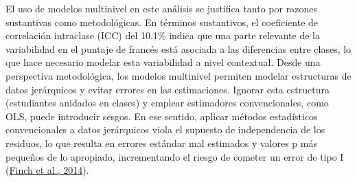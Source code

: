 \documentclass[
  12pt,
  a4paper,
]{article}
\begin{document}
\begin{table}[h!]
\begin{center}
\caption{\label{tab:table1} Modelos multinivel nulos con diferentes unidades de agrupación para puntaje en prueba de francés}
\label{table:coefficients}
\end{center}
\end{table}

El uso de modelos multinivel en este análisis se justifica tanto por razones sustantivas como metodológicas. En términos sustantivos, el coeficiente de correlación intraclase (ICC) del 10.1\% indica que una parte relevante de la variabilidad en el puntaje de francés está asociada a las diferencias entre clases, lo que hace necesario modelar esta variabilidad a nivel contextual. Desde una perspectiva metodológica, los modelos multinivel permiten modelar estructuras de datos jerárquicos y evitar errores en las estimaciones. Ignorar esta estructura (estudiantes anidados en clases) y emplear estimadores convencionales, como OLS, puede introducir sesgos. En ese sentido, aplicar métodos estadísticos convencionales a datos jerárquicos viola el supuesto de independencia de los residuos, lo que resulta en errores estándar mal estimados y valores p más pequeños de lo apropiado, incrementando el riesgo de cometer un error de tipo I (\protect\hyperlink{ref-finch_multilevel_2014}{Finch et al., 2014}).
\end{document}
